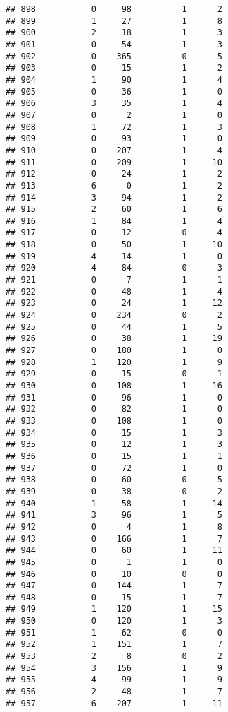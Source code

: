\documentclass[]{article}
\begin{document}
\begin{verbatim}
## 898           0     98          1      2
## 899           1     27          1      8
## 900           2     18          1      3
## 901           0     54          1      3
## 902           0    365          0      5
## 903           0     15          1      2
## 904           1     90          1      4
## 905           0     36          1      0
## 906           3     35          1      4
## 907           0      2          1      0
## 908           1     72          1      3
## 909           0     93          1      0
## 910           0    207          1      4
## 911           0    209          1     10
## 912           0     24          1      2
## 913           6      0          1      2
## 914           3     94          1      2
## 915           2     60          1      6
## 916           1     84          1      4
## 917           0     12          0      4
## 918           0     50          1     10
## 919           4     14          1      0
## 920           4     84          0      3
## 921           0      7          1      1
## 922           0     48          1      4
## 923           0     24          1     12
## 924           0    234          0      2
## 925           0     44          1      5
## 926           0     38          1     19
## 927           0    180          1      0
## 928           1    120          1      9
## 929           0     15          0      1
## 930           0    108          1     16
## 931           0     96          1      0
## 932           0     82          1      0
## 933           0    108          1      0
## 934           0     15          1      3
## 935           0     12          1      3
## 936           0     15          1      1
## 937           0     72          1      0
## 938           0     60          0      5
## 939           0     38          0      2
## 940           1     58          1     14
## 941           3     96          1      5
## 942           0      4          1      8
## 943           0    166          1      7
## 944           0     60          1     11
## 945           0      1          1      0
## 946           0     10          0      0
## 947           0    144          1      7
## 948           0     15          1      7
## 949           1    120          1     15
## 950           0    120          1      3
## 951           1     62          0      0
## 952           1    151          1      7
## 953           2      8          0      2
## 954           3    156          1      9
## 955           4     99          1      9
## 956           2     48          1      7
## 957           6    207          1     11

\end{verbatim}
\end{document}
